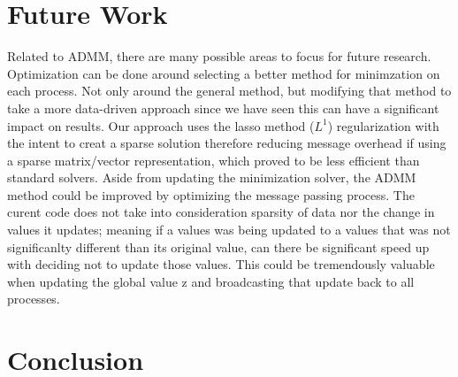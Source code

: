 \documentclass[letterpaper,11pt,onecolumn]{article}
\begin{document}
\section{Future Work}
Related to ADMM, there are many possible areas to focus for future research. Optimization can be done around selecting a better method for minimzation on each process. Not only around the general method, but modifying that method to take a more data-driven approach since we have seen this can have a significant impact on results. Our approach uses the lasso method ($L^{1}$) regularization with the intent to creat a sparse solution therefore reducing message overhead if using a sparse matrix/vector representation, which proved to be less efficient than standard solvers. 
\newline
Aside from updating the minimization solver, the ADMM method could be improved by optimizing the message passing process. The curent code does not take into consideration sparsity of data nor the change in values it updates; meaning if a values was being updated to a values that was not significanlty different than its original value, can there be significant speed up with deciding not to update those values. This could be tremendously valuable when updating the global value z and broadcasting that update back to all processes.

\section{Conclusion}

\vfill\pagebreak








 
 
\end{document}

